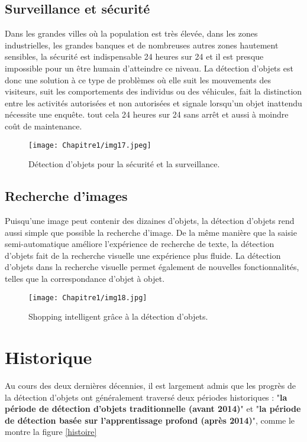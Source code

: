      
     \subsection{Surveillance et sécurité}
     Dans les grandes villes où la population est très élevée, dans les zones industrielles, les grandes banques et de nombreuses autres zones hautement sensibles, la sécurité est indispensable 24 heures sur 24 et il est presque impossible pour un être humain d'atteindre ce niveau. La détection d'objets est donc une solution à ce type de problèmes où elle suit les mouvements des visiteurs, suit les comportements des individus ou des véhicules, fait la distinction entre les activités autorisées et non autorisées et signale lorsqu'un objet inattendu nécessite une enquête. tout cela 24 heures sur 24 sans arrêt et aussi à moindre coût de maintenance.
     \begin{figure}[H]
          \centering
          \texttt{[image: Chapitre1/img17.jpeg]}
          \caption{Détection d'objets pour la sécurité et la surveillance.}
          \label{im17}
          \end{figure}

     \subsection{Recherche d'images}   
     Puisqu'une image peut contenir des dizaines d'objets, la détection d'objets rend aussi simple que possible la recherche d'image. De la même manière que la saisie semi-automatique améliore l'expérience de recherche de texte, la détection d'objets fait de la recherche visuelle une expérience plus fluide. La détection d'objets dans la recherche visuelle permet également de nouvelles fonctionnalités, telles que la correspondance d'objet à objet.
     \begin{figure}[H]
          \centering
          \texttt{[image: Chapitre1/img18.jpg]}
          \caption{Shopping intelligent grâce à la détection d'objets.}
          \label{im18}
          \end{figure}

\section{Historique}
Au cours des deux dernières décennies, il est largement admis que les progrès de la détection d'objets ont généralement traversé deux périodes historiques : "\textbf{la période de détection d'objets traditionnelle (avant 2014)}" et "\textbf{la période de détection basée sur l'apprentissage profond (après 2014)}", comme le montre la figure \ref{histoire}

